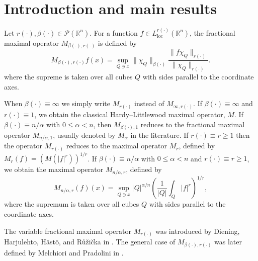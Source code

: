 \documentclass[a4paper,11pt,reqno]{amsart}
\theoremstyle{plain}
\numberwithin{equation}{section}
\theoremstyle{definition}
\newcommand{\R}{{\mathbb{R}^n}}
\begin{document}






\maketitle

\section{Introduction and main results}

 Let $r(\cdot),\beta(\cdot)\in \mathcal{P}(\R)$. For a function $f\in L^{r(\cdot)}_{\text{loc}}(\R)$, the fractional maximal operator $M_{\beta(\cdot),r(\cdot)}$ is defined by
\begin{equation}\label{def M}
	M_{\beta(\cdot),r(\cdot)}f(x)=\sup_{Q\ni x}\|\chi_Q\|_{\beta(\cdot)}\frac{\|f\chi_Q\|_{r(\cdot)}}{\|\chi_Q\|_{r(\cdot)}}.
\end{equation}
where the supreme is taken over all cubes $Q$ with sides parallel to the coordinate axes.

When $\beta(\cdot)\equiv\infty$ we simply write $M_{r(\cdot)}$ instead of $M_{\infty,r(\cdot)}$. If $\beta(\cdot)\equiv\infty$ and $r(\cdot)\equiv 1$, we obtain the classical Hardy--Littlewood maximal operator, $M$. If $\beta(\cdot)\equiv n/\alpha$ with $0\leq\alpha<n$, then $M_{\beta(\cdot),1}$ reduces to the fractional maximal operator $M_{n/\alpha,1}$, usually denoted by $M_\alpha$ in the literature. If $r(\cdot)\equiv r\geq 1$ then the operator $M_{r(\cdot)}$ reduces to the maximal operator $M_r$, defined by $M_r(f)=\left(M(|f|^r)\right)^{1/r}$. If $\beta(\cdot)\equiv n/\alpha$ with $0\leq\alpha<n$ and $r(\cdot)\equiv r\geq 1$, we obtain the maximal operator $M_{n/\alpha,r}$, defined by
$$M_{n/\alpha,r}(f)(x)=\sup_{Q\ni x}|Q|^{\alpha/n}\left(\frac{1}{|Q|}\int_{Q}|f|^r\right)^{1/r},$$
where the supremum is taken over all cubes $Q$ with sides parallel to the coordinate axes.


The variable fractional maximal operator $M_{r(\cdot)}$ was introduced by Diening, Harjulehto, Hästö, and Růžička in \cite{libro Diening}. The general case of $M_{\beta(\cdot),r(\cdot)}$ was later defined by Melchiori and Pradolini in \cite{Luciana Potential}.
\end{document}
